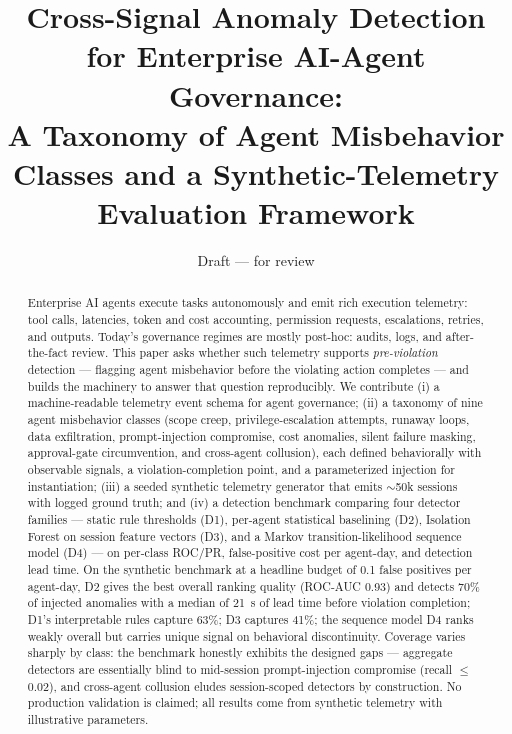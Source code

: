 \documentclass[10pt]{article}
\title{Cross-Signal Anomaly Detection for Enterprise AI-Agent Governance:\\
A Taxonomy of Agent Misbehavior Classes and a Synthetic-Telemetry\\
Evaluation Framework}
\author{Draft --- for review}
\date{}
\begin{document}
\maketitle

\begin{abstract}
Enterprise AI agents execute tasks autonomously and emit rich execution
telemetry: tool calls, latencies, token and cost accounting, permission
requests, escalations, retries, and outputs. Today's governance regimes are
mostly post-hoc: audits, logs, and after-the-fact review. This paper asks
whether such telemetry supports \emph{pre-violation} detection --- flagging
agent misbehavior before the violating action completes --- and builds the
machinery to answer that question reproducibly. We contribute (i) a
machine-readable telemetry event schema for agent governance; (ii) a taxonomy
of nine agent misbehavior classes (scope creep, privilege-escalation attempts,
runaway loops, data exfiltration, prompt-injection compromise, cost anomalies,
silent failure masking, approval-gate circumvention, and cross-agent
collusion), each defined behaviorally with observable signals, a
violation-completion point, and a parameterized injection for instantiation;
(iii) a seeded synthetic telemetry generator that emits $\sim$50k sessions
with logged ground truth; and (iv) a detection benchmark comparing four
detector families --- static rule thresholds (D1), per-agent statistical
baselining (D2), Isolation Forest on session feature vectors (D3), and a Markov
transition-likelihood sequence model (D4) --- on per-class ROC/PR,
false-positive cost per agent-day, and detection lead time. On the synthetic
benchmark at a headline budget of 0.1 false positives per agent-day, D2 gives
the best overall ranking quality (ROC-AUC 0.93) and detects 70\% of injected
anomalies with a median of 21~s of lead time before violation completion;
D1's interpretable rules capture 63\%; D3 captures 41\%; the sequence model
D4 ranks weakly overall but carries unique signal on behavioral discontinuity.
Coverage varies sharply by class: the benchmark honestly exhibits the designed
gaps --- aggregate detectors are essentially blind to mid-session
prompt-injection compromise (recall $\le$ 0.02), and cross-agent collusion
eludes session-scoped detectors by construction. No production validation is
claimed; all results come from synthetic telemetry with illustrative
parameters.
\end{abstract}

\end{document}
